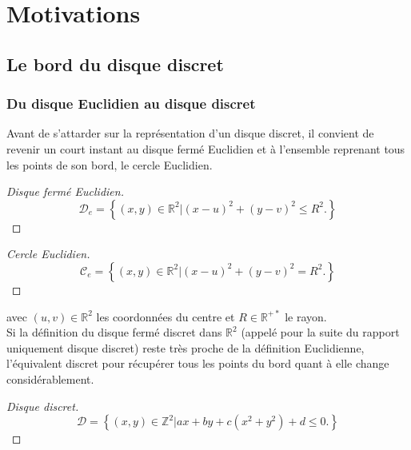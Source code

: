 \section{Motivations}

\subsection{Le bord du disque discret}

\subsubsection{Du disque Euclidien au disque discret}

Avant de s'attarder sur la représentation d'un disque discret, il convient de revenir un court instant au disque fermé Euclidien et à l'ensemble reprenant tous les points de son bord, le cercle Euclidien.

\begin{proof}[Disque fermé Euclidien]
  $$\mathcal{D}_e =  \left\{ (x,y) \in \mathbb{R}^{2} |  (x - u)^2 + (y - v)^2 \leq R^2. \right\}$$
\end{proof}

\begin{proof}[Cercle Euclidien]
  $$\mathcal{C}_e =  \left\{ (x,y) \in \mathbb{R}^{2} |  (x - u)^2 + (y - v)^2 = R^2. \right\}$$
\end{proof}

avec $(u,v) \in \mathbb{R}^{2}$ les coordonnées du centre et $R \in \mathbb{R}^{+*}$ le rayon.\\


Si la définition du disque fermé discret dans $\mathbb{R}^{2}$ (appelé pour la suite du rapport uniquement disque discret) reste très proche de la définition Euclidienne, l'équivalent discret pour récupérer tous les points du bord quant à elle change considérablement.

\begin{proof}[Disque discret]
  $$\mathcal{D} =  \left\{ (x,y) \in \mathbb{Z}^{2} |  ax + by + c(x^2 + y^2) + d \leq 0. \right\}$$
\end{proof}

